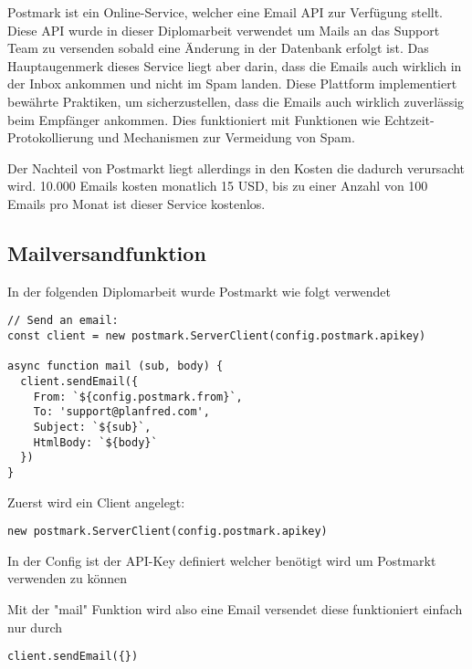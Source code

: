 Postmark ist ein Online-Service, welcher eine Email API zur Verfügung stellt. Diese API wurde in dieser Diplomarbeit verwendet um Mails an das Support Team zu versenden sobald eine Änderung in der Datenbank erfolgt ist. Das Hauptaugenmerk dieses Service liegt aber darin, dass die Emails auch wirklich in der Inbox ankommen und nicht im Spam landen. Diese Plattform implementiert bewährte Praktiken, um sicherzustellen, dass die Emails auch wirklich zuverlässig beim Empfänger ankommen. Dies funktioniert mit Funktionen wie Echtzeit-Protokollierung und Mechanismen zur Vermeidung von Spam.

Der Nachteil von Postmarkt liegt allerdings in den Kosten die dadurch verursacht wird. 10.000 Emails kosten monatlich 15 USD, bis zu einer Anzahl von 100 Emails pro Monat ist dieser Service kostenlos.
\newpage

\subsection{Mailversandfunktion}

In der folgenden Diplomarbeit wurde Postmarkt wie folgt verwendet


\begin{lstlisting}
// Send an email:
const client = new postmark.ServerClient(config.postmark.apikey)

async function mail (sub, body) {
  client.sendEmail({
    From: `${config.postmark.from}`,
    To: 'support@planfred.com',
    Subject: `${sub}`,
    HtmlBody: `${body}`
  })
}
\end{lstlisting}

Zuerst wird ein Client angelegt:
\begin{lstlisting}
new postmark.ServerClient(config.postmark.apikey)
\end{lstlisting}
In der Config ist der API-Key definiert welcher benötigt wird um Postmarkt verwenden zu können

Mit der "mail" Funktion wird also eine Email versendet diese funktioniert einfach nur durch 
\begin{lstlisting}
client.sendEmail({})
\end{lstlisting}
